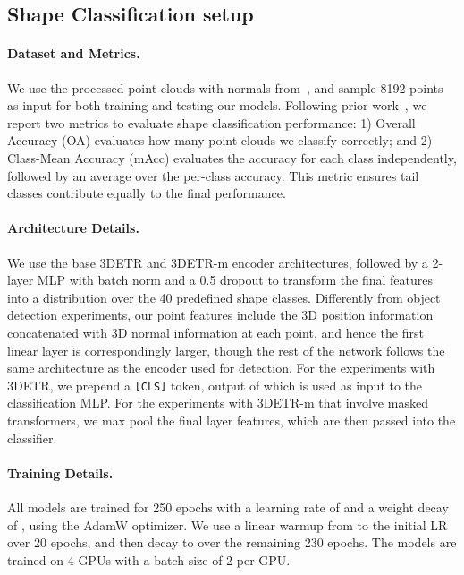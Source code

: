 \documentclass[10pt,twocolumn,letterpaper]{article}
\newcommand{\OURS}{3DETR\xspace}
\newcommand{\OURSm}{3DETR-m\xspace}
\begin{document}
\subsection{Shape Classification setup}

\paragraph{Dataset and Metrics.}
We use the processed point clouds with normals from~\cite{qi2017pointnet++}, and sample 8192 points as input for both training and testing our models.
Following prior work~\cite{zhao2019pointweb}, we report two metrics to evaluate shape classification performance: 1) Overall Accuracy (OA) evaluates how many point clouds we classify correctly; and 2) Class-Mean Accuracy (mAcc) evaluates the accuracy for each class independently, followed by an average over the per-class accuracy. This metric ensures tail classes contribute equally to the final performance.

\paragraph{Architecture Details.}
We use the base \OURS and \OURSm encoder architectures, followed by a 2-layer MLP with batch norm and a 0.5 dropout to transform the final features into a distribution over the 40 predefined shape classes. Differently from object detection experiments, our point features include the 3D position information concatenated with 3D normal information at each point, and hence the first linear layer is correspondingly larger, though the rest of the network follows the same architecture as the encoder used for detection. For the experiments with \OURS, we prepend a \texttt{[CLS]} token, output of which is used as input to the classification MLP. For the experiments with \OURSm that involve masked transformers, we max pool the final layer features, which are then passed into the classifier.

\paragraph{Training Details.} All models are trained for 250 epochs with a learning rate of  and a weight decay of , using the AdamW optimizer. We use a linear warmup from  to the initial LR over 20 epochs, and then decay to  over the remaining 230 epochs.
The models are trained on 4 GPUs with a batch size of 2 per GPU.

{\small


}
\end{document}
